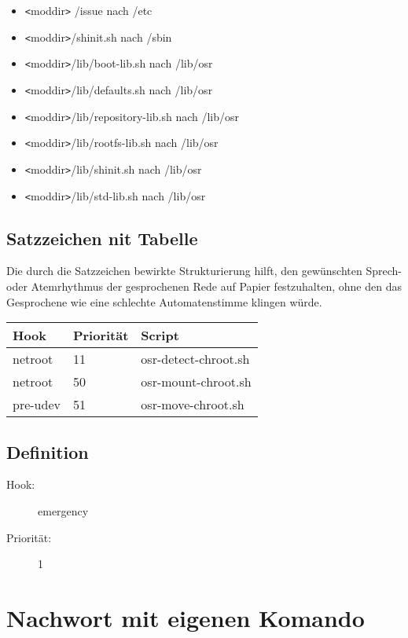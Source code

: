 \documentclass[10pt,a4paper]{article}
\begin{document}
\begin{itemize}
 \item \verb|<|moddir\verb|>| /issue nach /etc
 \item \verb|<|moddir\verb|>|/shinit.sh nach /sbin
 \item \verb|<|moddir\verb|>|/lib/boot-lib.sh nach /lib/osr
 \item \verb|<|moddir\verb|>|/lib/defaults.sh nach /lib/osr
 \item \verb|<|moddir\verb|>|/lib/repository-lib.sh nach /lib/osr
 \item \verb|<|moddir\verb|>|/lib/rootfs-lib.sh nach /lib/osr
 \item \verb|<|moddir\verb|>|/lib/shinit.sh nach /lib/osr
 \item \verb|<|moddir\verb|>|/lib/std-lib.sh nach /lib/osr
\end{itemize}

\subsection{Satzzeichen nit Tabelle}

Die durch die Satzzeichen bewirkte Strukturierung hilft, den gewünschten
Sprech- oder Atemrhythmus der gesprochenen Rede auf Papier festzuhalten,
ohne den das Gesprochene wie eine schlechte Automatenstimme klingen würde.

\begin{tabular}{|l|l|l|}
 \hline
\textbf{Hook} & \textbf{Priorität} & \textbf{Script} \\ \hline
netroot  & 11 & osr-detect-chroot.sh \\ \hline
netroot  & 50 & osr-mount-chroot.sh \\ \hline
pre-udev & 51 & osr-move-chroot.sh \\ \hline
\end{tabular}

\subsection{Definition}


\begin{description}
\item[Hook:] emergency
\item[Priorität:] 1
\end{description}

\section{Nachwort mit eigenen Komando}
\end{document}
